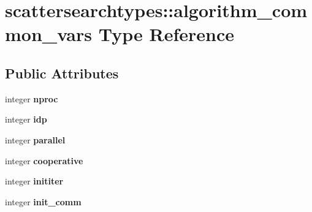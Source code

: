 \hypertarget{structscattersearchtypes_1_1algorithm__common__vars}{\section{scattersearchtypes\-:\-:algorithm\-\_\-common\-\_\-vars Type Reference}
\label{structscattersearchtypes_1_1algorithm__common__vars}
}
\subsection*{Public Attributes}
\begin{DoxyCompactItemize}
\item 
\hypertarget{structscattersearchtypes_1_1algorithm__common__vars_afa12578385343b4f618d97490ec3fce3}{integer {\bfseries nproc}}\label{structscattersearchtypes_1_1algorithm__common__vars_afa12578385343b4f618d97490ec3fce3}

\item 
\hypertarget{structscattersearchtypes_1_1algorithm__common__vars_a1a87618b163a43ccb389122183125358}{integer {\bfseries idp}}\label{structscattersearchtypes_1_1algorithm__common__vars_a1a87618b163a43ccb389122183125358}

\item 
\hypertarget{structscattersearchtypes_1_1algorithm__common__vars_af4a663945d54f51faba45a52bc354689}{integer {\bfseries parallel}}\label{structscattersearchtypes_1_1algorithm__common__vars_af4a663945d54f51faba45a52bc354689}

\item 
\hypertarget{structscattersearchtypes_1_1algorithm__common__vars_a528d0c607c069811cb1341485e5d3b51}{integer {\bfseries cooperative}}\label{structscattersearchtypes_1_1algorithm__common__vars_a528d0c607c069811cb1341485e5d3b51}

\item 
\hypertarget{structscattersearchtypes_1_1algorithm__common__vars_a637b68bf16e6852e62ac176fae76ab03}{integer {\bfseries inititer}}\label{structscattersearchtypes_1_1algorithm__common__vars_a637b68bf16e6852e62ac176fae76ab03}

\item 
\hypertarget{structscattersearchtypes_1_1algorithm__common__vars_a309b379c7ac6ba1540b142f9d6b622bb}{integer {\bfseries init\-\_\-comm}}\label{structscattersearchtypes_1_1algorithm__common__vars_a309b379c7ac6ba1540b142f9d6b622bb}


\end{DoxyCompactItemize}

